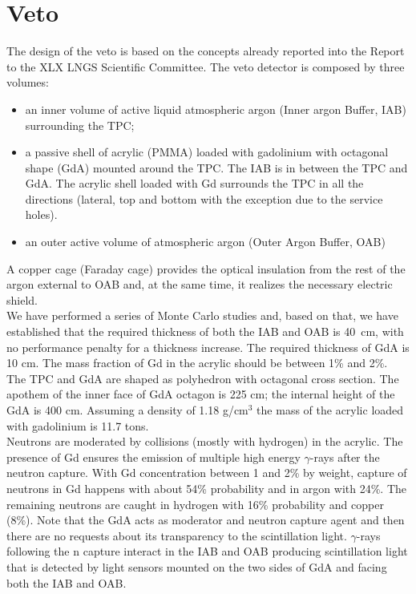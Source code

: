 \section{Veto}

The design of the  veto is based on the concepts already  reported into the Report to the XLX LNGS Scientific Committee. The veto detector is composed by three volumes:
\begin{itemize}
    \item an inner volume of active liquid atmospheric argon  (Inner argon Buffer, IAB) surrounding the TPC;
    \item a passive shell of acrylic (PMMA) loaded with gadolinium with octagonal shape (GdA) mounted around the TPC. The IAB is in between the TPC and GdA. 
    The  acrylic shell loaded with Gd surrounds the TPC in all the directions (lateral, top and bottom with the exception due to the service holes). 
    \item an outer  active volume of atmospheric argon (Outer Argon Buffer, OAB) 
\end{itemize}
 A copper cage (Faraday cage) provides the optical insulation from the rest of the argon external to OAB and, at the same time, it realizes the necessary electric  shield.\\
We have performed a series of Monte Carlo studies and, based on that, we have established that
the required thickness of both the IAB and OAB is 40~cm, with no performance penalty for a thickness increase. The required thickness of GdA is 10 cm. The  mass fraction of Gd  in the acrylic should be between 1\% and 2\%. \\
The TPC and GdA are shaped as polyhedron with  octagonal cross section. The apothem of the inner face of GdA octagon
is 225 cm; the internal height of the GdA is 400 cm.
Assuming a density of 1.18  g/cm$^3$ the mass of the acrylic loaded with gadolinium  is 11.7 tons. \\
Neutrons   are moderated by collisions (mostly with  hydrogen)  in the acrylic. The presence of Gd  ensures the emission of multiple high energy  $\gamma$-rays after the neutron capture. With Gd concentration between 1 and 2\% by weight, capture of neutrons  in Gd happens with  about 54\% probability and in argon with 24\%. The remaining neutrons are caught in hydrogen with 16\% probability and copper (8\%). 
 Note that the GdA acts as moderator and neutron capture agent and then there are no requests about its transparency to the scintillation light.
 $\gamma$-rays following the n capture interact in the IAB and OAB producing scintillation light that is detected by light sensors mounted on the two sides of GdA and facing both the IAB and OAB. \\  
